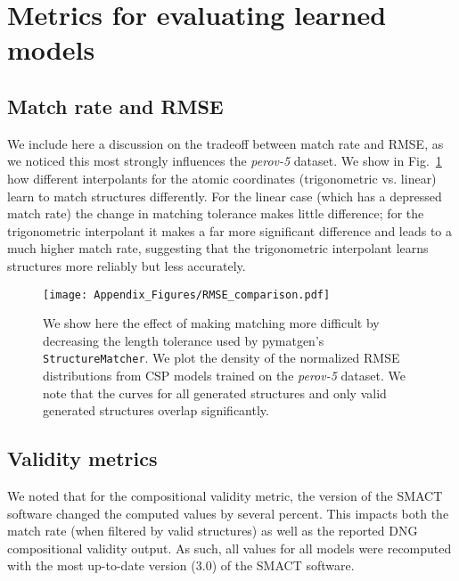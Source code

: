 \section{Metrics for evaluating learned models} \label{app:hyp_metrics}

\subsection{Match rate and RMSE}

We include here a discussion on the tradeoff between match rate and RMSE, as we noticed this most strongly influences the \textit{perov-5} dataset. 
We show in Fig.~\ref{fig:RMSE_perov} how different interpolants for the atomic coordinates (trigonometric vs. linear) learn to match structures differently. 
For the linear case (which has a depressed match rate) the change in matching tolerance makes little difference; for the trigonometric interpolant it makes a far more significant difference and leads to a much higher match rate, suggesting that the trigonometric interpolant learns structures more reliably but less accurately.

\begin{figure}[th]
   \centering
   \texttt{[image: Appendix\_Figures/RMSE\_comparison.pdf]}
   \caption{We show here the effect of making matching more difficult by decreasing the length tolerance used by pymatgen's \texttt{StructureMatcher}. We plot the density of the normalized RMSE distributions from CSP models trained on the \textit{perov-5} dataset. We note that the curves for all generated structures and only valid generated structures overlap significantly.}
   \label{fig:RMSE_perov}
\end{figure}

\subsection{Validity metrics}

We noted that for the compositional validity metric, the version of the SMACT software \citep{davies_smact_2019} changed the computed values by several percent.
This impacts both the match rate (when filtered by valid structures) as well as the reported DNG compositional validity output.
As such, all values for all models were recomputed with the most up-to-date version (3.0) of the SMACT software.

